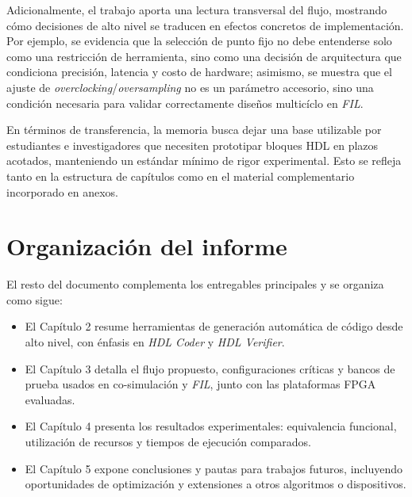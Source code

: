 Adicionalmente, el trabajo aporta una lectura transversal del flujo, mostrando cómo decisiones de alto nivel se traducen en efectos concretos de implementación. Por ejemplo, se evidencia que la selección de punto fijo no debe entenderse solo como una restricción de herramienta, sino como una decisión de arquitectura que condiciona precisión, latencia y costo de hardware; asimismo, se muestra que el ajuste de \textit{overclocking}/\textit{oversampling} no es un parámetro accesorio, sino una condición necesaria para validar correctamente diseños multicíclo en \textit{FIL}.

En términos de transferencia, la memoria busca dejar una base utilizable por estudiantes e investigadores que necesiten prototipar bloques HDL en plazos acotados, manteniendo un estándar mínimo de rigor experimental. Esto se refleja tanto en la estructura de capítulos como en el material complementario incorporado en anexos.

\section{Organización del informe}

El resto del documento complementa los entregables principales y se organiza como sigue:

\begin{itemize}
    \item El Capítulo 2 resume herramientas de generación automática de código desde alto nivel, con énfasis en \textit{HDL Coder} y \textit{HDL Verifier}.
    \item El Capítulo 3 detalla el flujo propuesto, configuraciones críticas y bancos de prueba usados en co-simulación y \textit{FIL}, junto con las plataformas FPGA evaluadas.
    \item El Capítulo 4 presenta los resultados experimentales: equivalencia funcional, utilización de recursos y tiempos de ejecución comparados.
    \item El Capítulo 5 expone conclusiones y pautas para trabajos futuros, incluyendo oportunidades de optimización y extensiones a otros algoritmos o dispositivos.
\end{itemize}
